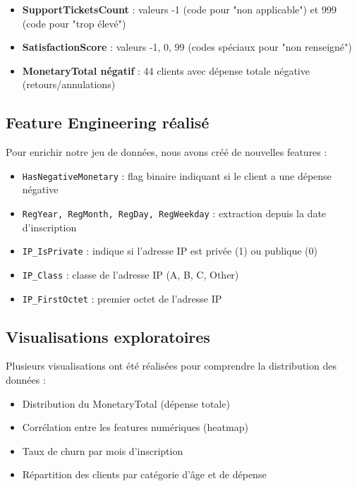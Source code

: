 \documentclass[11pt,a4paper]{article}
\begin{document}
\begin{itemize}
    \item \textbf{SupportTicketsCount} : valeurs -1 (code pour "non applicable") et 999 (code pour "trop élevé")
    \item \textbf{SatisfactionScore} : valeurs -1, 0, 99 (codes spéciaux pour "non renseigné")
    \item \textbf{MonetaryTotal négatif} : 44 clients avec dépense totale négative (retours/annulations)
\end{itemize}

\subsection{Feature Engineering réalisé}
Pour enrichir notre jeu de données, nous avons créé de nouvelles features :

\begin{tcolorbox}[title=✨ Nouvelles features créées]
\begin{itemize}
    \item \texttt{HasNegativeMonetary} : flag binaire indiquant si le client a une dépense négative
    \item \texttt{RegYear, RegMonth, RegDay, RegWeekday} : extraction depuis la date d'inscription
    \item \texttt{IP\_IsPrivate} : indique si l'adresse IP est privée (1) ou publique (0)
    \item \texttt{IP\_Class} : classe de l'adresse IP (A, B, C, Other)
    \item \texttt{IP\_FirstOctet} : premier octet de l'adresse IP
\end{itemize}
\end{tcolorbox}

\subsection{Visualisations exploratoires}
Plusieurs visualisations ont été réalisées pour comprendre la distribution des données :

\begin{itemize}
    \item Distribution du MonetaryTotal (dépense totale)
    \item Corrélation entre les features numériques (heatmap)
    \item Taux de churn par mois d'inscription
    \item Répartition des clients par catégorie d'âge et de dépense
\end{itemize}
\end{document}
